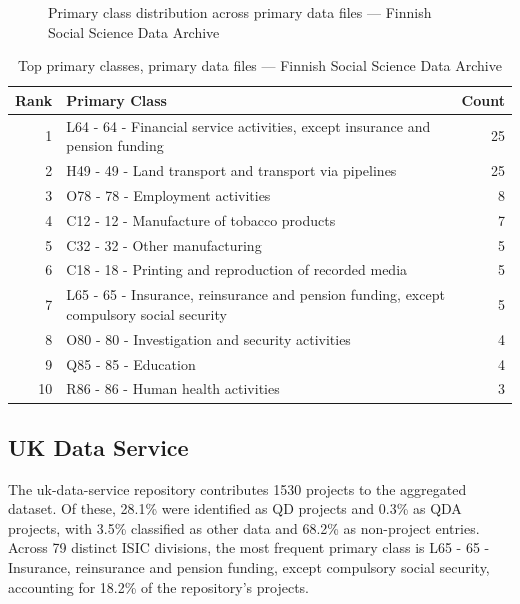 \clearpage

\begin{figure}[H]
    \centering
    
    \caption{Primary class distribution across primary data files --- Finnish Social Science Data Archive}
\end{figure}

\begin{table}[H]
    \centering
    \begin{tabular}{r p{10cm} r}
    \hline
    \textbf{Rank} & \textbf{Primary Class} & \textbf{Count} \\
    \hline
    1 & L64 - 64 - Financial service activities, except insurance and pension funding & 25 \\
    2 & H49 - 49 - Land transport and transport via pipelines & 25 \\
    3 & O78 - 78 - Employment activities & 8 \\
    4 & C12 - 12 - Manufacture of tobacco products & 7 \\
    5 & C32 - 32 - Other manufacturing & 5 \\
    6 & C18 - 18 - Printing and reproduction of recorded media & 5 \\
    7 & L65 - 65 - Insurance, reinsurance and pension funding, except compulsory social security & 5 \\
    8 & O80 - 80 - Investigation and security activities & 4 \\
    9 & Q85 - 85 - Education & 4 \\
    10 & R86 - 86 - Human health activities & 3 \\
    \hline
    \end{tabular}
    \caption{Top primary classes, primary data files --- Finnish Social Science Data Archive}
\end{table}

\clearpage

\subsection{UK Data Service}


The uk-data-service repository contributes 1530 projects to the aggregated dataset. Of these, 28.1\% were identified as QD projects and 0.3\% as QDA projects, with 3.5\% classified as other data and 68.2\% as non-project entries. Across 79 distinct ISIC divisions, the most frequent primary class is L65 - 65 - Insurance, reinsurance and pension funding, except compulsory social security, accounting for 18.2\% of the repository's projects.


